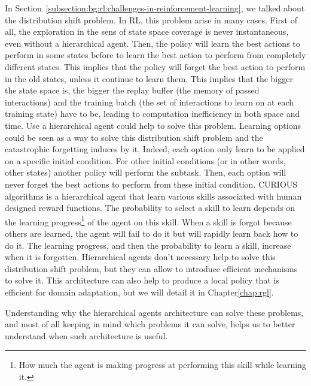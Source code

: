 In Section~\ref{subsection:bg:rl:challenges-in-reinforcement-learning}, we talked about the distribution shift problem.
In RL, this problem arise in many cases.
First of all, the exploration in the sens of state space coverage is never instantaneous, even without a hierarchical
agent.
Then, the policy will learn the best actions to perform in some states before to learn the best action to perform from
completely different states.
This implies that the policy will forget the best action to perform in the old states, unless it continue to learn them.
This implies that the bigger the state space is, the bigger the replay buffer (the memory of passed interactions) and
the training batch (the set of interactions to learn on at each training state) have to be, leading to computation
inefficiency in both space and time.
Use a hierarchical agent could help to solve this problem.
Learning options could be seen as a way to solve this distribution shift problem and the catastrophic forgetting induces
by it.
Indeed, each option only learn to be applied on a specific initial condition.
For other initial conditions (or in other words, other states) another policy will perform the subtask.
Then, each option will never forget the best actions to perform from these initial condition.
CURIOUS\citep{colas2019curious} algorithms is a hierarchical agent that learn various skills associated with human
designed reward functions.
The probability to select a skill to learn depends on the learning
progress\footnote{How much the agent is making progress at performing this skill while learning it.} of the agent on
this skill.
When a skill is forgot because others are learned, the agent will fail to do it but will rapidly learn back how to do
it.
The learning progress, and then the probability to learn a skill, increase when it is forgotten.
Hierarchical agents don't necessary help to solve this distribution shift problem, but they can allow to introduce
efficient mechanisms to solve it.
This architecture can also help to produce a local policy that is efficient for domain adaptation, but we will detail it
in Chapter\ref{chap:rgl}.

Understanding why the hierarchical agents architecture can solve these problems, and most of all keeping in mind which
problems it can solve, helps us to better understand when such architecture is useful.
